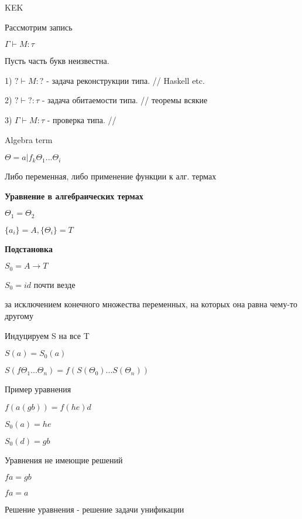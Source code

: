 
\begin{para}{KEK}

Рассмотрим запись

$\Gamma \vdash M : \tau$

Пусть часть букв неизвестна.

1) $? \vdash M : ?$ - задача реконструкции типа. // Haskell etc.

2) $? \vdash ? : \tau$ - задача обитаемости типа. // теоремы всякие

3) $\Gamma \vdash M : \tau$ - проверка типа. // 

\end{para}



\begin{para}{Algebra term}

$\Theta = a | f_k \Theta_1 ... \Theta_i$

Либо переменная, либо применение функции к алг. термах

\textbf{Уравнение в алгебраических термах}

$\Theta_1 = \Theta_2$

$\{a_i\} = A, \{\Theta_i\} = T$

\textbf{Подстановка}

$S_0 = A \rightarrow T$

$S_0 = id$ почти везде

за исключением конечного множества переменных, на которых она равна чему-то другому

Индуцируем S на все T

$S(a) = S_0(a)$

$S(f \Theta_1 ... \Theta_n) = f (S(\Theta_0) ... S(\Theta_n))$

Пример уравнения

$f(a (g b)) = f (h e) d$

$S_0 (a) = h e$

$S_0 (d) = gb$

Уравнения не имеющие решений

$f a = g b$

$f a = a$

Решение уравнения - решение задачи унификации

\end{para}



